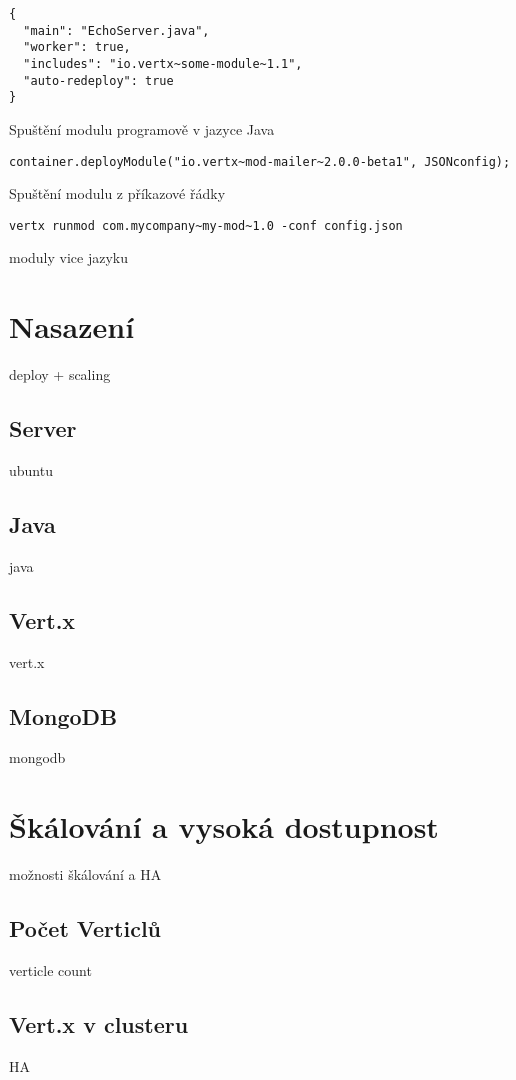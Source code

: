 \begin{lstlisting}
{
  "main": "EchoServer.java",
  "worker": true,
  "includes": "io.vertx~some-module~1.1",
  "auto-redeploy": true
}
\end{lstlisting}

Spuštění modulu programově v jazyce Java
\begin{lstlisting}
container.deployModule("io.vertx~mod-mailer~2.0.0-beta1", JSONconfig);
\end{lstlisting}

Spuštění modulu z příkazové řádky
\begin{lstlisting}
vertx runmod com.mycompany~my-mod~1.0 -conf config.json
\end{lstlisting}

moduly vice jazyku

\section{Nasazení}

deploy + scaling

\subsection{Server}

ubuntu

\subsection{Java}

java

\subsection{Vert.x}

vert.x

\subsection{MongoDB}

mongodb

\section{Škálování a vysoká dostupnost}\label{sub:Scaling}

možnosti škálování a HA

\subsection{Počet Verticlů}
verticle count

\subsection{Vert.x v clusteru}
HA
